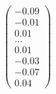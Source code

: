 \documentclass[preview]{standalone}
\begin{document}
\begin{align*}
\begin{pmatrix} -0.09 \\ -0.01 \\ 0.01 \\ \dots \\ 0.01 \\ -0.03 \\ -0.07 \\ 0.04 \end{pmatrix}
\end{align*}
\end{document}

